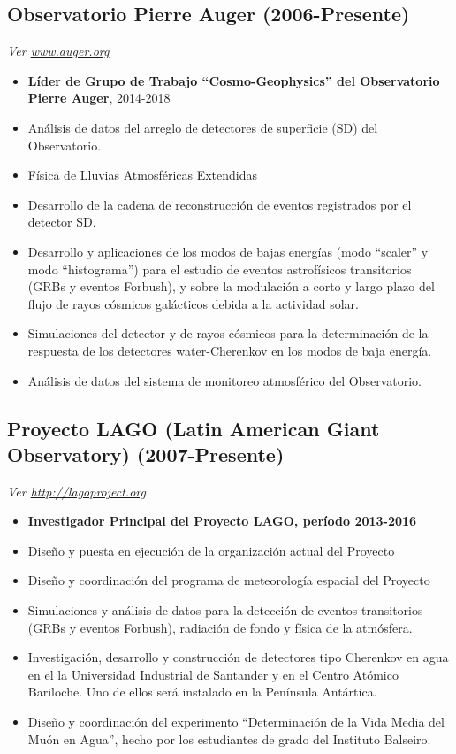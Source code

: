 \subsection*{Observatorio Pierre Auger (2006-Presente)}

{\small{\textit{Ver \href{http://www.auger.org/}{www.auger.org}}}}
\begin{itemize}
\item {\bf{Líder de Grupo de Trabajo ``Cosmo-Geophysics'' del Observatorio Pierre Auger}}, 2014-2018
\item Análisis de datos del arreglo de detectores de superficie (SD) del Observatorio.
\item Física de Lluvias Atmosféricas Extendidas
\item Desarrollo de la cadena de reconstrucción de eventos registrados por el detector SD.
\item Desarrollo y aplicaciones de los modos de bajas energías (modo ``scaler'' y modo ``histograma'') para el estudio de eventos astrofísicos transitorios (GRBs y eventos Forbush), y sobre la modulación a corto y largo plazo del flujo de rayos cósmicos galácticos debida a la actividad solar.
\item Simulaciones del detector y de rayos cósmicos para la determinación de la respuesta de los detectores water-Cherenkov en los modos de baja energía.
\item Análisis de datos del sistema de monitoreo atmosférico del Observatorio.
\end{itemize}

\subsection*{Proyecto LAGO (Latin American Giant Observatory) (2007-Presente)}
{\small{\textit{Ver \href{http://lagoproject.org}{http://lagoproject.org}}}}
\begin{itemize}
\item {\bf{Investigador Principal del Proyecto LAGO, período 2013-2016}}
\item Diseño y puesta en ejecución de la organización actual del Proyecto
\item Diseño y coordinación del programa de meteorología espacial del Proyecto
\item Simulaciones y análisis de datos para la detección de eventos transitorios (GRBs y eventos Forbush), radiación de fondo y física de la atmósfera.
\item Investigación, desarrollo y construcción de detectores tipo Cherenkov en agua en el la Universidad Industrial de Santander y en el Centro Atómico Bariloche. Uno de ellos será instalado en la Península Antártica. 
\item Diseño y coordinación del experimento ``Determinación de la Vida Media del Muón en Agua'', hecho por los estudiantes de grado del Instituto Balseiro.
\end{itemize}

